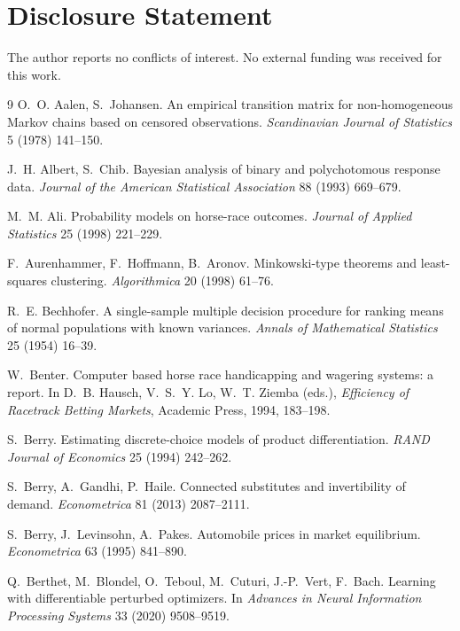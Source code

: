 \documentclass[12pt]{article}
\theoremstyle{remark}
\begin{document}
\section*{Disclosure Statement}

The author reports no conflicts of interest. No external funding was
received for this work.

\begin{thebibliography}{9}
 O.~O. Aalen, S.~Johansen.
An empirical transition matrix for non-homogeneous Markov chains based on
censored observations. \emph{Scandinavian Journal of Statistics} 5
(1978) 141--150.

 J.~H. Albert, S.~Chib.
Bayesian analysis of binary and polychotomous response data.
\emph{Journal of the American Statistical Association} 88 (1993)
669--679.

 M.~M. Ali. Probability models on horse-race
outcomes. \emph{Journal of Applied Statistics} 25 (1998) 221--229.

 F.~Aurenhammer, F.~Hoffmann, B.~Aronov.
Minkowski-type theorems and least-squares clustering.
\emph{Algorithmica} 20 (1998) 61--76.

 R.~E. Bechhofer. A single-sample
multiple decision procedure for ranking means of normal populations with
known variances. \emph{Annals of Mathematical Statistics} 25 (1954)
16--39.

 W.~Benter. Computer based horse
race handicapping and wagering systems: a report. In D.~B. Hausch,
V.~S.~Y. Lo, W.~T. Ziemba (eds.), \emph{Efficiency of Racetrack
Betting Markets}, Academic Press, 1994, 183--198.

 S.~Berry. Estimating discrete-choice
models of product differentiation. \emph{RAND Journal of Economics} 25
(1994) 242--262.

 S.~Berry, A.~Gandhi, P.~Haile. Connected substitutes
and invertibility of demand. \emph{Econometrica} 81 (2013) 2087--2111.

 S.~Berry, J.~Levinsohn, A.~Pakes. Automobile prices in
market equilibrium. \emph{Econometrica} 63 (1995) 841--890.

 Q.~Berthet, M.~Blondel, O.~Teboul, M.~Cuturi,
J.-P.~Vert, F.~Bach. Learning with differentiable perturbed optimizers. In
\emph{Advances in Neural Information Processing Systems} 33 (2020)
9508--9519.


\end{thebibliography}
\end{document}
